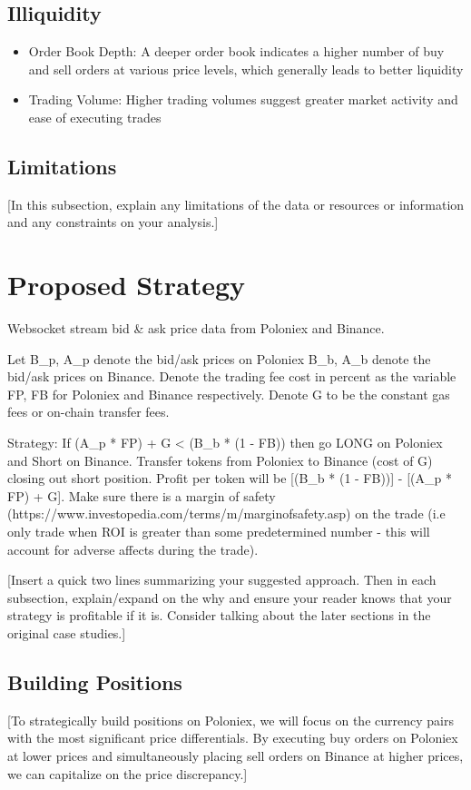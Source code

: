 \documentclass{article}
\begin{document}
\subsection{Illiquidity}
\begin{itemize}
  \item Order Book Depth: A deeper order book indicates a higher number of buy and sell orders at various price levels, which generally leads to better liquidity
  \item Trading Volume: Higher trading volumes suggest greater market activity and ease of executing trades
\end{itemize}
\subsection{Limitations}
[In this subsection, explain any limitations of the data or resources or information and any constraints on your analysis.]

\section{Proposed Strategy}
Websocket stream bid & ask price data from Poloniex and Binance.

Let B_p, A_p denote the bid/ask prices on Poloniex B_b, A_b denote the bid/ask prices on Binance. Denote the trading fee cost in percent as the variable FP, FB for Poloniex and Binance respectively. Denote G to be the constant gas fees or on-chain transfer fees.

Strategy:
If (A_p * FP) + G < (B_b * (1 - FB)) then go LONG on Poloniex and Short on Binance. Transfer tokens from Poloniex to Binance (cost of G) closing out short position. Profit per token will be [(B_b * (1 - FB))] - [(A_p * FP) + G]. Make sure there is a margin of safety (https://www.investopedia.com/terms/m/marginofsafety.asp) on the trade (i.e only trade when ROI is greater than some predetermined number - this will account for adverse affects during the trade).



[Insert a quick two lines summarizing your suggested approach. Then in each subsection, explain/expand on the why and ensure your reader knows that your strategy is profitable if it is. Consider talking about the later sections in the original case studies.]
\subsection{Building Positions}
[To strategically build positions on Poloniex, we will focus on the currency pairs with the most significant price differentials. By executing buy orders on Poloniex at lower prices and simultaneously placing sell orders on Binance at higher prices, we can capitalize on the price discrepancy.]
\end{document}
